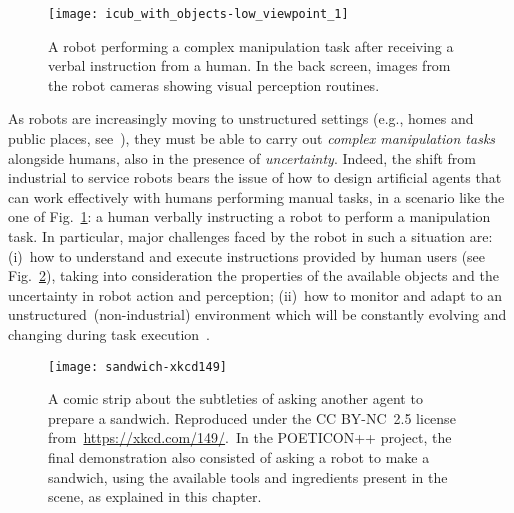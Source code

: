 \begin{figure}
\centering
\texttt{[image: icub\_with\_objects-low\_viewpoint\_1]}
\caption[A robot performing a complex manipulation task after receiving a verbal instruction from a human.]{A robot performing a complex manipulation task after receiving a verbal instruction from a human.
In the back screen, images from the robot cameras showing visual perception routines.}
\label{fig:icub_with_objects}
\end{figure}

As robots are increasingly moving to unstructured settings (e.g., homes and public places, see~\cite{prassler:2016:domestic}), they must be able to carry out \emph{complex manipulation tasks} alongside humans, also in the presence of \emph{uncertainty}.
Indeed, the shift from industrial to service robots bears the issue of how to design artificial agents that can work effectively with humans performing manual tasks, in a scenario like the one of Fig.~\ref{fig:icub_with_objects}: a human verbally instructing a robot to perform a manipulation task.
In particular, major challenges faced by the robot in such a situation are:
(i)~how to understand and execute instructions provided by human users (see Fig.~\ref{fig:sandwich_xkcd}), taking into consideration the properties of the available objects and the uncertainty in robot action and perception;
(ii)~how to monitor and adapt to an unstructured~(non-industrial) environment which will be constantly evolving and changing during task execution~\cite{haazebroek:2011:cognprocess}.

\begin{figure}
\centering
\texttt{[image: sandwich-xkcd149]}
\caption[A comic strip about the subtleties of asking another agent to prepare a sandwich.]{A comic strip about the subtleties of asking another agent to prepare a sandwich. Reproduced under the CC BY-NC~2.5 license from~\url{https://xkcd.com/149/}\protect\footnotemark.\ In the POETICON++ project, the final demonstration also consisted of asking a robot to make a sandwich, using the available tools and ingredients present in the scene, as explained in this chapter.}
\label{fig:sandwich_xkcd}
\end{figure}

